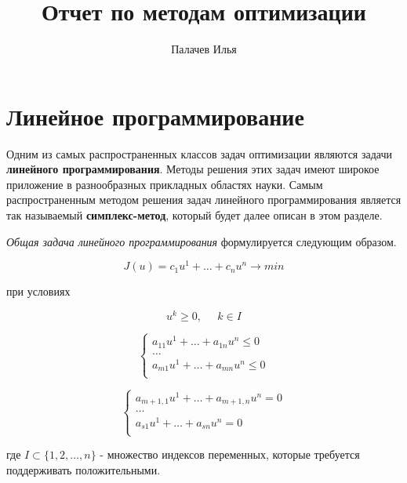 \documentclass[a4paper, 12pt, titlepage]{article}
\title{Отчет по методам оптимизации}
\author{Палачев Илья}
\theoremstyle{definition}
\theoremstyle{plain}
\theoremstyle{plain}
\begin{document}
\maketitle

\tableofcontents

\newpage
\section{Линейное программирование}
Одним из самых распространенных классов задач оптимизации являются задачи
\textbf{линейного программирования}. Методы решения этих задач имеют широкое
приложение в разнообразных прикладных областях науки. Самым распространенным
методом решения задач линейного программирования является так называемый
\textbf{симплекс-метод}, который будет далее описан в этом разделе.

\textit{Общая задача линейного программирования} формулируется следующим
образом.

\begin{equation}
\label{eq:gen-lp}
 J(u) = c_{1} u^{1} + \ldots + c_{n} u^{n} \to min
\end{equation}

при условиях

\begin{equation}
\label{eq:gen-lp-cond1}
 u^{k} \geq 0, \;\;\;\;\; k \in I
\end{equation}

\begin{equation}
\label{eq:gen-lp-cond2}
 \left\{
  \begin{aligned}
   a_{11} u^{1} + \ldots + a_{1n} u^{n} \leq 0 \\
   \ldots \\
   a_{m1} u^{1} + \ldots + a_{mn} u^{n} \leq 0 \\
  \end{aligned}
 \right.
\end{equation}

\begin{equation}
\label{eq:gen-lp-cond3}
 \left\{
  \begin{aligned}
   a_{m + 1, 1} u^{1} + \ldots + a_{m + 1, n} u^{n} = 0 \\
   \ldots \\
   a_{s1} u^{1} + \ldots + a_{sn} u^{n} = 0 \\
  \end{aligned}
 \right.
\end{equation}

где $I \subset \{1, 2, \ldots, n\}$ - множество индексов переменных, которые
требуется поддерживать положительными.
\end{document}
